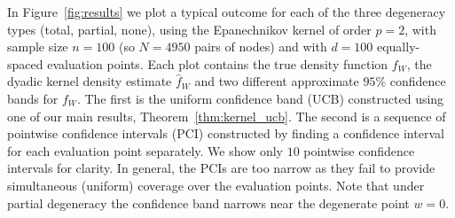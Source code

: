 In Figure~\ref{fig:results} we plot a typical outcome for each of the three
degeneracy types (total, partial, none), using the Epanechnikov kernel of order
$p=2$, with sample size $n=100$ (so $N=4950$ pairs of nodes) and with $d=100$
equally-spaced evaluation points. Each plot contains the true density function
$f_W$, the dyadic kernel density estimate $\hat f_W$ and two different
approximate $95\%$ confidence bands for $f_W$. The first is the uniform
confidence band (UCB) constructed using one of our main results,
Theorem~\ref{thm:kernel_ucb}. The second is a sequence of pointwise confidence
intervals (PCI) constructed by finding a confidence interval for each
evaluation point separately. We show only $10$ pointwise confidence intervals
for clarity. In general, the PCIs are too narrow as they fail to provide
simultaneous (uniform) coverage over the evaluation points. Note that under
partial degeneracy the confidence band narrows near the degenerate point
$w = 0$.

